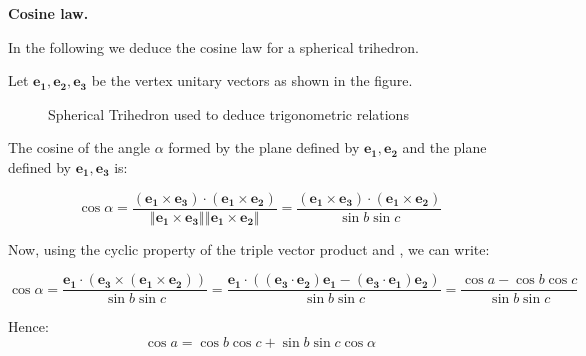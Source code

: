 \documentclass[12pt]{article}
\newcommand{\norm}[1]{\left\Vert#1\right\Vert}
\newcommand{\bd}[1]{\mathbf{#1}}
\begin{document}
{\bf Cosine law.}

\medskip
In the following we deduce the cosine law for a spherical trihedron.

Let $\mathbf {e_1, e_2, e_3}$ be the vertex unitary vectors as shown
in the figure. \bigskip

\begin{figure}[h]
\begin{center}
\caption{Spherical Trihedron used to deduce trigonometric relations}
\label{fig1}
\end{center}
\end{figure}

\noindent The cosine of the angle $\alpha$ formed by the plane
defined by $\mathbf {e_1, e_2}$ and the plane defined by $\mathbf
{e_1, e_3}$ is:

$$\cos \alpha=\frac{( \bd{e_1} \times \bd{e_3}) \cdot (\bd{e_1} \times \bd{e_2})}{\norm{\bd{e_1} \times
\bd{e_3}}\norm{\bd{e_1} \times \bd{e_2}}} = \frac{( \bd{e_1} \times
\bd{e_3}) \cdot (\bd{e_1} \times \bd{e_2})}{\sin b \sin c}$$ 

\noindent Now, using the cyclic property of the triple vector product and , we can write:

\medskip

$$\cos \alpha=\frac{ \bd{e_1} \cdot (\bd{e_3} \times (\bd{e_1}
\times \bd{e_2}))}{\sin b \sin c} = \frac{ \bd{e_1} \cdot
((\bd{e_3}\cdot\bd{e_2})\bd{e_1}-(\bd{e_3}\cdot\bd{e_1})\bd{e_2})
}{\sin b \sin c}=\frac{\cos a -\cos b \cos c}{\sin b \sin c}$$

Hence: $$\cos a=\cos b \cos c + \sin b \sin c \cos \alpha$$
\end{document}
